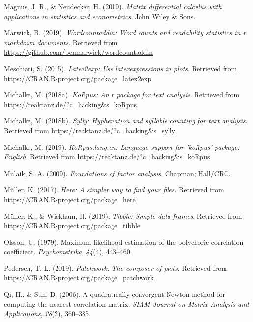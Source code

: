 \documentclass[
  english,
  man]{apa6}
\begin{document}
\leavevmode\hypertarget{ref-magnus2019matrix}{}%
Magnus, J. R., \& Neudecker, H. (2019). \emph{Matrix differential calculus with applications in statistics and econometrics}. John Wiley \& Sons.

\leavevmode\hypertarget{ref-R-wordcountaddin}{}%
Marwick, B. (2019). \emph{Wordcountaddin: Word counts and readability statistics in r markdown documents}. Retrieved from \url{https://github.com/benmarwick/wordcountaddin}

\leavevmode\hypertarget{ref-R-latex2exp}{}%
Meschiari, S. (2015). \emph{Latex2exp: Use latexexpressions in plots}. Retrieved from \url{https://CRAN.R-project.org/package=latex2exp}

\leavevmode\hypertarget{ref-R-koRpus}{}%
Michalke, M. (2018a). \emph{KoRpus: An r package for text analysis}. Retrieved from \url{https://reaktanz.de/?c=hacking\&s=koRpus}

\leavevmode\hypertarget{ref-R-sylly}{}%
Michalke, M. (2018b). \emph{Sylly: Hyphenation and syllable counting for text analysis}. Retrieved from \url{https://reaktanz.de/?c=hacking\&s=sylly}

\leavevmode\hypertarget{ref-R-koRpus.lang.en}{}%
Michalke, M. (2019). \emph{KoRpus.lang.en: Language support for 'koRpus' package: English}. Retrieved from \url{https://reaktanz.de/?c=hacking\&s=koRpus}

\leavevmode\hypertarget{ref-mulaik2009foundations}{}%
Mulaik, S. A. (2009). \emph{Foundations of factor analysis}. Chapman; Hall/CRC.

\leavevmode\hypertarget{ref-R-here}{}%
Müller, K. (2017). \emph{Here: A simpler way to find your files}. Retrieved from \url{https://CRAN.R-project.org/package=here}

\leavevmode\hypertarget{ref-R-tibble}{}%
Müller, K., \& Wickham, H. (2019). \emph{Tibble: Simple data frames}. Retrieved from \url{https://CRAN.R-project.org/package=tibble}

\leavevmode\hypertarget{ref-olsson1979maximum}{}%
Olsson, U. (1979). Maximum likelihood estimation of the polychoric correlation coefficient. \emph{Psychometrika}, \emph{44}(4), 443--460.

\leavevmode\hypertarget{ref-R-patchwork}{}%
Pedersen, T. L. (2019). \emph{Patchwork: The composer of plots}. Retrieved from \url{https://CRAN.R-project.org/package=patchwork}

\leavevmode\hypertarget{ref-qi2006}{}%
Qi, H., \& Sun, D. (2006). A quadratically convergent Newton method for computing the nearest correlation matrix. \emph{SIAM Journal on Matrix Analysis and Applications}, \emph{28}(2), 360--385.
\end{document}
